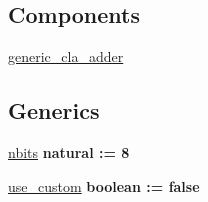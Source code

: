 \subsection*{Components}
 \begin{DoxyCompactItemize}
\item 
\hyperlink{group___adder_gae7148956d4ef1d1cd14f35060634b9c3}{generic\+\_\+cla\+\_\+adder}  {\bfseries }  
\end{DoxyCompactItemize}
\subsection*{Generics}
 \begin{DoxyCompactItemize}
\item 
\hyperlink{group___adder_gae8451a648abadfad273ca1ae9b369657}{nbits} {\bfseries {\bfseries \textcolor{vhdlchar}{natural}\textcolor{vhdlchar}{ }\textcolor{vhdlchar}{ }\textcolor{vhdlchar}{\+:}\textcolor{vhdlchar}{=}\textcolor{vhdlchar}{ }\textcolor{vhdlchar}{ } \textcolor{vhdldigit}{8} \textcolor{vhdlchar}{ }}}
\item 
\hyperlink{group___adder_gadf05ca347ec6d3c85740dc697469b3db}{use\+\_\+custom} {\bfseries {\bfseries \textcolor{vhdlchar}{boolean}\textcolor{vhdlchar}{ }\textcolor{vhdlchar}{ }\textcolor{vhdlchar}{\+:}\textcolor{vhdlchar}{=}\textcolor{vhdlchar}{ }\textcolor{vhdlchar}{ }\textcolor{vhdlchar}{ }\textcolor{vhdlchar}{ }\textcolor{vhdlchar}{false}\textcolor{vhdlchar}{ }}}
\end{DoxyCompactItemize}
